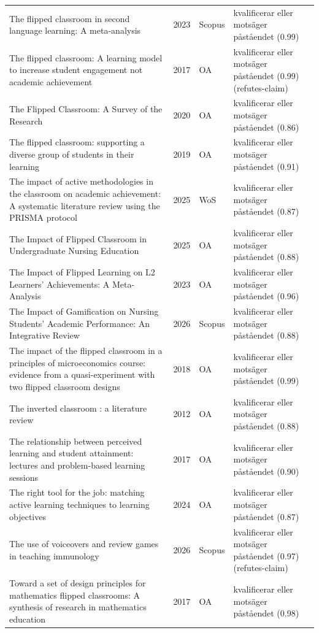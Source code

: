 \begin{longtable}{@{}%
  >{\raggedright\arraybackslash}p{}c%
  >{\raggedright\arraybackslash}p{}%
  >{\raggedright\arraybackslash}p{}@{}}
The flipped classroom in second language learning: A meta-analysis & 2023 & Scopus & kvalificerar eller motsäger påståendet (0.99) \\
The flipped classroom: A learning model to increase student engagement not academic achievement & 2017 & OA & kvalificerar eller motsäger påståendet (0.99) (refutes-claim) \\
The Flipped Classroom: A Survey of the Research & 2020 & OA & kvalificerar eller motsäger påståendet (0.86) \\
The flipped classroom: supporting a diverse group of students in their learning & 2019 & OA & kvalificerar eller motsäger påståendet (0.91) \\
The impact of active methodologies in the classroom on academic achievement: A systematic literature review using the PRISMA protocol & 2025 & WoS & kvalificerar eller motsäger påståendet (0.87) \\
The Impact of Flipped Classroom in Undergraduate Nursing Education & 2025 & OA & kvalificerar eller motsäger påståendet (0.88) \\
The Impact of Flipped Learning on L2 Learners' Achievements: A Meta-Analysis & 2023 & OA & kvalificerar eller motsäger påståendet (0.96) \\
The Impact of Gamification on Nursing Students' Academic Performance: An Integrative Review & 2026 & Scopus & kvalificerar eller motsäger påståendet (0.88) \\
The impact of the flipped classroom in a principles of microeconomics course: evidence from a quasi-experiment with two flipped classroom designs & 2018 & OA & kvalificerar eller motsäger påståendet (0.99) \\
The inverted classroom : a literature review & 2012 & OA & kvalificerar eller motsäger påståendet (0.88) \\
The relationship between perceived learning and student attainment: lectures and problem-based learning sessions & 2017 & OA & kvalificerar eller motsäger påståendet (0.90) \\
The right tool for the job: matching active learning techniques to learning objectives & 2024 & OA & kvalificerar eller motsäger påståendet (0.87) \\
The use of voiceovers and review games in teaching immunology & 2026 & Scopus & kvalificerar eller motsäger påståendet (0.97) (refutes-claim) \\
Toward a set of design principles for mathematics flipped classrooms: A synthesis of research in mathematics education & 2017 & OA & kvalificerar eller motsäger påståendet (0.98) \\

\end{longtable}
